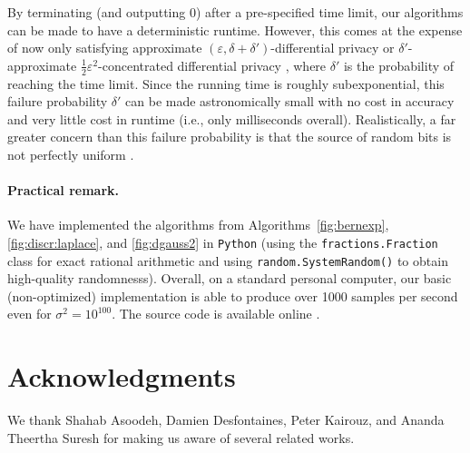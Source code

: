 \documentclass{jpcfinal} %
\newcommand{\eps}{\varepsilon}
\begin{document}
By terminating (and outputting 0) after a pre-specified time limit, our algorithms can be made to have a deterministic runtime. However, this comes at the expense of now only satisfying approximate $(\eps,\delta+\delta')$-differential privacy or $\delta'$-approximate $\frac12\eps^2$-concentrated differential privacy \citep{BunS16}, where $\delta'$ is the probability of reaching the time limit. Since the running time is roughly subexponential, this failure probability $\delta'$ can be made astronomically small with no cost in accuracy and very little cost in runtime (i.e., only milliseconds overall). Realistically, a far greater concern than this failure probability is that the source of random bits is not perfectly uniform \citep{GarfinkelL20}.

\paragraph{Practical remark.}
We have implemented the algorithms from Algorithms~\ref{fig:bernexp}, \ref{fig:discr:laplace}, and \ref{fig:dgauss2} in \texttt{Python} (using the \texttt{fractions.Fraction} class for exact rational arithmetic and using \texttt{random.SystemRandom()} to obtain high-quality randomnesss). Overall, on a standard personal computer, our basic (non-optimized) implementation is able to produce over 1000 samples per second even for $\sigma^2=10^{100}$. The source code is available online \citep{DGaussGithub}. 

\section*{Acknowledgments}
We thank Shahab Asoodeh, Damien Desfontaines, Peter Kairouz, and Ananda Theertha Suresh for making us aware of several related works.


%

%


\appendix
\end{document}
